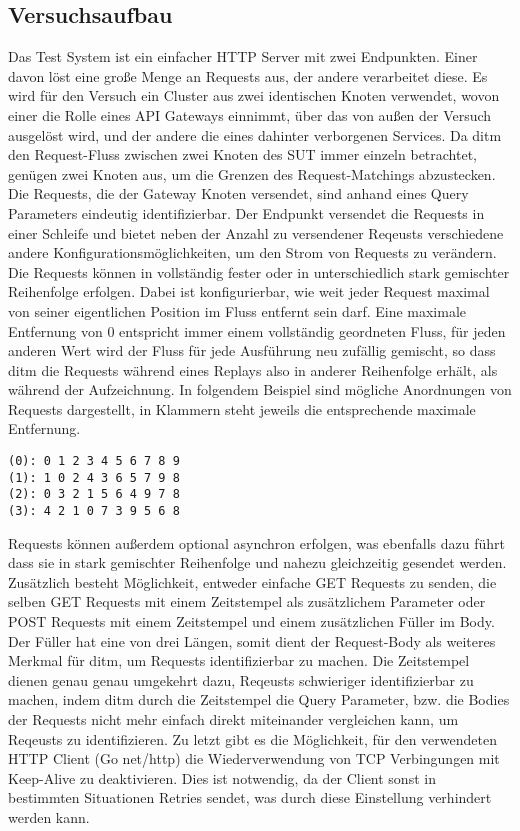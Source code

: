 \documentclass[a4paper]{report}
\begin{document}
\subsection{Versuchsaufbau}
Das Test System ist ein einfacher HTTP Server mit zwei Endpunkten. Einer davon löst
eine große Menge an Requests aus, der andere verarbeitet diese. Es wird für den Versuch ein Cluster aus zwei identischen
Knoten verwendet, wovon einer die Rolle eines API Gateways einnimmt, über das von außen der Versuch ausgelöst wird,
und der andere die eines dahinter verborgenen Services. Da ditm den Request-Fluss zwischen zwei Knoten des SUT immer einzeln
betrachtet, genügen zwei Knoten aus, um die Grenzen des Request-Matchings abzustecken.
Die Requests, die der Gateway Knoten versendet, sind anhand eines Query Parameters eindeutig identifizierbar.
Der Endpunkt versendet die Requests in einer Schleife und bietet neben der Anzahl zu versendener Reqeusts verschiedene
andere Konfigurationsmöglichkeiten, um den Strom von Requests zu verändern.
Die Requests können in vollständig fester oder in unterschiedlich stark gemischter Reihenfolge erfolgen. Dabei ist konfigurierbar,
wie weit jeder Request maximal von seiner eigentlichen Position im Fluss entfernt sein darf. Eine maximale Entfernung
von 0 entspricht immer einem vollständig geordneten Fluss, für jeden anderen Wert wird der Fluss für jede Ausführung neu
zufällig gemischt, so dass ditm die Requests während eines Replays also in anderer Reihenfolge erhält, als während der
Aufzeichnung. In folgendem Beispiel sind mögliche Anordnungen von Requests dargestellt, in Klammern steht jeweils die
entsprechende maximale Entfernung.
\begin{verbatim}
(0): 0 1 2 3 4 5 6 7 8 9
(1): 1 0 2 4 3 6 5 7 9 8
(2): 0 3 2 1 5 6 4 9 7 8
(3): 4 2 1 0 7 3 9 5 6 8
\end{verbatim}
Requests können außerdem optional asynchron erfolgen, was ebenfalls dazu führt dass sie in stark gemischter Reihenfolge und nahezu gleichzeitig
gesendet werden.
Zusätzlich besteht Möglichkeit, entweder einfache GET Requests zu senden, die selben GET Requests mit einem Zeitstempel
als zusätzlichem Parameter oder POST Requests mit einem Zeitstempel und einem zusätzlichen Füller im Body. Der Füller hat eine von
drei Längen, somit dient der Request-Body als weiteres Merkmal für ditm, um Requests identifizierbar zu machen. Die Zeitstempel dienen
genau genau umgekehrt dazu, Reqeusts schwieriger identifizierbar zu machen, indem ditm durch die Zeitstempel die Query Parameter,
bzw. die Bodies der Requests nicht mehr einfach direkt miteinander vergleichen kann, um Reqeusts zu identifizieren.
Zu letzt gibt es die Möglichkeit, für den verwendeten HTTP Client (Go net/http) die Wiederverwendung von TCP Verbingungen mit Keep-Alive
zu deaktivieren. Dies ist notwendig, da der Client sonst in bestimmten Situationen Retries sendet, was durch diese Einstellung
verhindert werden kann.
\end{document}
